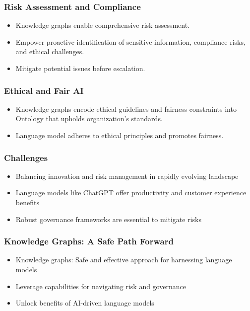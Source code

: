 \begin{frame}[fragile]\frametitle{Risk Assessment and Compliance}
\begin{itemize}
\item Knowledge graphs enable comprehensive risk assessment.
\item Empower proactive identification of sensitive information, compliance risks, and ethical challenges.
\item Mitigate potential issues before escalation.
\end{itemize}
\end{frame}

\begin{frame}[fragile]\frametitle{Ethical and Fair AI}
\begin{itemize}
\item Knowledge graphs encode ethical guidelines and fairness constraints into Ontology that upholds organization's standards.
\item Language model adheres to ethical principles and promotes fairness.
\end{itemize}
\end{frame}

\begin{frame}[fragile]\frametitle{Challenges}
\begin{itemize}
\item Balancing innovation and risk management in rapidly evolving landscape
\item Language models like ChatGPT offer productivity and customer experience benefits
\item Robust governance frameworks are essential to mitigate risks
\end{itemize}
\end{frame}

\begin{frame}[fragile]\frametitle{Knowledge Graphs: A Safe Path Forward}
\begin{itemize}
\item Knowledge graphs: Safe and effective approach for harnessing language models
\item Leverage capabilities for navigating risk and governance
\item Unlock benefits of AI-driven language models
\end{itemize}
\end{frame}

